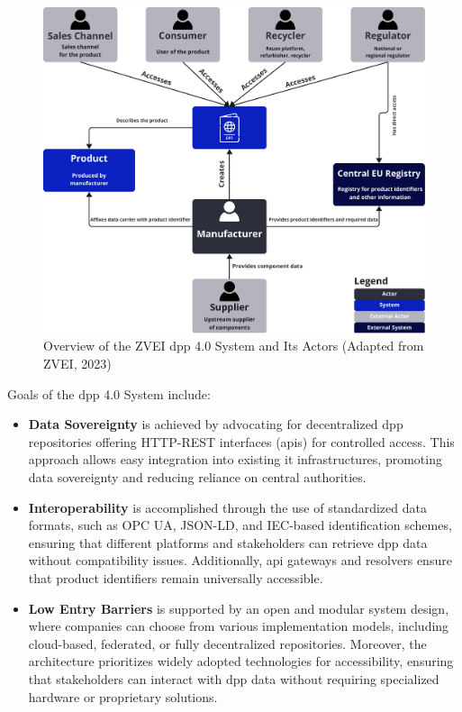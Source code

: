 \begin{figure}[ht]
    \centering
    \includegraphics[width=\textwidth]{figures/dpp_system.pdf}
    \caption{Overview of the ZVEI \ac{dpp} 4.0 System and Its Actors (Adapted from ZVEI, 2023)}
    \label{fig:dpp_system_overview}
\end{figure}

Goals of the \ac{dpp} 4.0 System include:

\begin{itemize}[itemsep=0.5\baselineskip]
    \item \textbf{Data Sovereignty} is achieved by advocating for decentralized \ac{dpp} repositories offering HTTP-REST interfaces (\ac{api}s) for controlled access. This approach allows easy integration into existing \ac{it} infrastructures, promoting data sovereignty and reducing reliance on central authorities.
    \item \textbf{Interoperability} is accomplished through the use of standardized data formats, such as OPC UA, JSON-LD, and IEC-based identification schemes, ensuring that different platforms and stakeholders can retrieve \ac{dpp} data without compatibility issues. Additionally, \ac{api} gateways and resolvers ensure that product identifiers remain universally accessible.
    \item \textbf{Low Entry Barriers} is supported by an open and modular system design, where companies can choose from various implementation models, including cloud-based, federated, or fully decentralized repositories. Moreover, the architecture prioritizes widely adopted technologies for accessibility, ensuring that stakeholders can interact with \ac{dpp} data without requiring specialized hardware or proprietary solutions.
\end{itemize}

